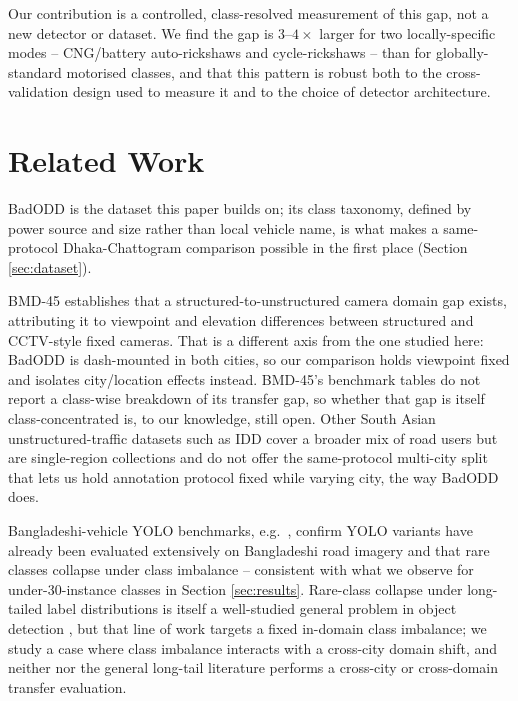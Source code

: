 \documentclass[conference,a4paper]{IEEEtran}
\begin{document}
Our contribution is a controlled, class-resolved measurement of this gap, not a new
detector or dataset. We find the gap is $3$--$4\times$ larger for two locally-specific
modes -- CNG/battery auto-rickshaws and cycle-rickshaws -- than for globally-standard
motorised classes, and that this pattern is robust both to the cross-validation design
used to measure it and to the choice of detector architecture.

\section{Related Work}
\label{sec:related}

BadODD \cite{baig2024badodd} is the dataset this paper builds on; its class taxonomy,
defined by power source and size rather than local vehicle name, is what makes a
same-protocol Dhaka-Chattogram comparison possible in the first place (Section
\ref{sec:dataset}).

BMD-45 \cite{sharma2026bmd45} establishes that a structured-to-unstructured camera
domain gap exists, attributing it to viewpoint and elevation differences between
structured and CCTV-style fixed cameras. That is a different axis from the one studied
here: BadODD is dash-mounted in both cities, so our comparison holds viewpoint fixed
and isolates city/location effects instead. BMD-45's benchmark tables do not report a
class-wise breakdown of its transfer gap, so whether that gap is itself
class-concentrated is, to our knowledge, still open. Other South Asian unstructured-traffic
datasets such as IDD \cite{varma2019idd} cover a broader mix of road users but are
single-region collections and do not offer the same-protocol multi-city split that
lets us hold annotation protocol fixed while varying city, the way BadODD does.

Bangladeshi-vehicle YOLO benchmarks, e.g.\ \cite{hossain2025yolobd}, confirm YOLO
variants have already been evaluated extensively on Bangladeshi road imagery and that
rare classes collapse under class imbalance -- consistent with what we observe for
under-30-instance classes in Section \ref{sec:results}. Rare-class collapse under
long-tailed label distributions is itself a well-studied general problem in object
detection \cite{lin2017focalloss,li2022eqfl}, but that line of work targets a fixed
in-domain class imbalance; we study a case where class imbalance interacts with a
cross-city domain shift, and neither \cite{hossain2025yolobd} nor the general
long-tail literature performs a cross-city or cross-domain transfer evaluation.
\end{document}
